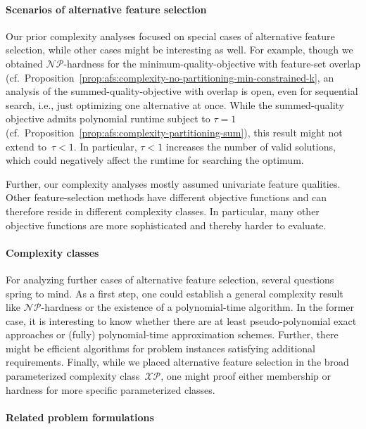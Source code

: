 \documentclass{article}
\theoremstyle{definition}
\begin{document}
\paragraph{Scenarios of alternative feature selection}

Our prior complexity analyses focused on special cases of alternative feature selection, while other cases might be interesting as well.
For example, though we obtained $\mathcal{NP}$-hardness for the minimum-quality-objective with feature-set overlap (cf.~Proposition~\ref{prop:afs:complexity-no-partitioning-min-constrained-k}, an analysis of the summed-quality-objective with overlap is open, even for sequential search, i.e., just optimizing one alternative at once.
While the summed-quality objective admits polynomial runtime subject to $\tau=1$ (cf.~Proposition~\ref{prop:afs:complexity-partitioning-sum}), this result might not extend to~$\tau < 1$.
In particular, $\tau < 1$ increases the number of valid solutions, which could negatively affect the runtime for searching the optimum.

Further, our complexity analyses mostly assumed univariate feature qualities.
Other feature-selection methods have different objective functions and can therefore reside in different complexity classes.
In particular, many other objective functions are more sophisticated and thereby harder to evaluate.

\paragraph{Complexity classes}

For analyzing further cases of alternative feature selection, several questions spring to mind.
As a first step, one could establish a general complexity result like $\mathcal{NP}$-hardness or the existence of a polynomial-time algorithm.
In the former case, it is interesting to know whether there are at least pseudo-polynomial exact approaches or (fully) polynomial-time approximation schemes.
Further, there might be efficient algorithms for problem instances satisfying additional requirements.
Finally, while we placed alternative feature selection in the broad parameterized complexity class~$\mathcal{XP}$, one might proof either membership or hardness for more specific parameterized classes.

\paragraph{Related problem formulations}
\end{document}
